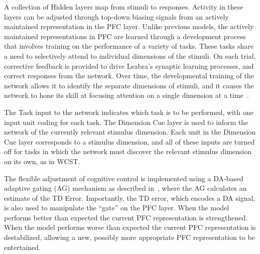 A collection of Hidden layers map from stimuli to responses.  
Activity in these layers can be
adjusted through top-down biasing signals from an actively
maintained representation in the PFC layer.  Unlike previous models,
the actively maintained representations in PFC are learned through
a development process that involves training
on the performance of a variety of tasks.  These tasks
share a need to selectively attend to individual dimensions of the
stimuli.  On each trial, corrective feedback is provided to drive
Leabra's synaptic learning processes, and correct responses from the
network.  Over time, the developmental training of
the network allows it to identify the separate dimensions of stimuli,
and it causes the network to hone its skill at focusing attention on a
single dimension at a time~\cite{RougierNP:2005:XT}.

The Task input to the network indicates which task is to be performed,
with one input unit coding for each task.  The Dimension Cue layer is
used to inform the network of the currently relevant stimulus
dimension.   Each
unit in the Dimension Cue layer corresponds to a stimulus dimension,
and all of these inputs are turned off for tasks in which the network
must discover the relevant stimulus dimension on its own, as in WCST.

The flexible adjustment of cognitive control is implemented using a
DA-based adaptive gating (AG) mechanism as described in~\cite{RougierNP:2005:XT}, where the AG calculates an estimate of the TD Error.  
Importantly, the TD error, which encodes a DA
signal, is also used to manipulate the ``gate'' on the PFC layer.
When the model performs better than expected the
current PFC representation is strengthened.
When the model performs worse than expected the
current PFC representation is destabilized, allowing a new, possibly
more appropriate PFC representation to be entertained.  

